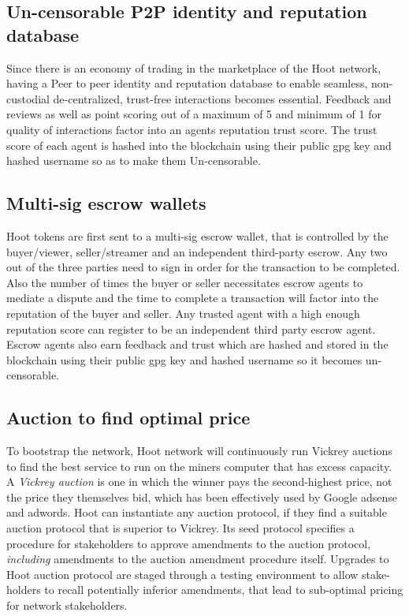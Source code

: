 \documentclass{article}
\begin{document}
\subsection{Un-censorable P2P identity and reputation database}
Since there is an economy of trading in the marketplace of the Hoot network, having a Peer to peer
identity and reputation database to enable seamless, non-custodial
de-centralized, trust-free interactions becomes essential. Feedback and reviews as well as point scoring out of a maximum of 5 and minimum of 1 for quality of interactions factor into an agents reputation trust score. The trust score of each agent is hashed into the blockchain using their public gpg key and hashed username so as to make them Un-censorable.

\subsection{Multi-sig escrow wallets}
Hoot tokens are first sent to a multi-sig escrow wallet, that is controlled by the buyer/viewer, seller/streamer and an
independent third-party escrow. Any
two out of the three parties need to sign in order for the transaction to be
completed. Also the number of times the buyer or seller necessitates
escrow agents to mediate a dispute and the time to complete a
transaction will factor into the reputation of the buyer and
seller. Any trusted agent with a high enough reputation score can
register to be an independent third party escrow agent. Escrow agents
also earn feedback and trust which are hashed and stored in the
blockchain using their public gpg key and hashed username so it
becomes un-censorable.


\subsection{Auction to find optimal price}
To bootstrap the network, Hoot network will continuously run Vickrey auctions to find the best service to run on the miners computer that has excess capacity. A \emph{Vickrey auction} is one in which the winner pays the second-highest price, not the price they themselves bid, which has been effectively used by Google adsense and adwords.
Hoot can instantiate any auction protocol, if they find a suitable auction protocol that is superior to Vickrey. Its seed protocol specifies a procedure for stakeholders to approve amendments to the auction protocol,
\emph{including} amendments to the auction amendment procedure
itself. Upgrades to Hoot auction protocol are staged through a testing
environment to allow stake-holders to recall potentially inferior
amendments, that lead to sub-optimal pricing for network
stakeholders. 
\end{document}
